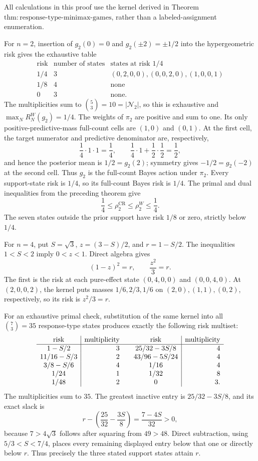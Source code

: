 All calculations in this proof use the kernel derived in Theorem \(\mathrm{thm{:}response\mbox{-}type\mbox{-}minimax\mbox{-}games}\), rather than a labeled-assignment enumeration.

For \(n=2\), insertion of \(g_2(0)=0\) and \(g_2(\pm2)=\pm1/2\) into the hypergeometric risk gives the exhaustive table
\[
\begin{array}{c|c|c}
\text{risk}&\text{number of states}&\text{states at risk }1/4\\ \hline
1/4&3&(0,2,0,0),(0,0,2,0),(1,0,0,1)\\
1/8&4&\text{none}\\
0&3&\text{none}.
\end{array}
\]
The multiplicities sum to \(\binom{5}{3}=10=|\mathcal N_2|\), so this is exhaustive and \(\max_NR_N^W(g_2)=1/4\).  The weights of \(\pi_2\) are positive and sum to one.  Its only positive-predictive-mass full-count cells are \((1,0)\) and \((0,1)\).  At the first cell, the target numerator and predictive denominator are, respectively,
\[
 \frac14\cdot1\cdot1=\frac14,
 \qquad
 \frac14\cdot1+\frac12\cdot\frac12=\frac12,
\]
and hence the posterior mean is \(1/2=g_2(2)\); symmetry gives \(-1/2=g_2(-2)\) at the second cell.  Thus \(g_2\) is the full-count Bayes action under \(\pi_2\).  Every support-state risk is \(1/4\), so its full-count Bayes risk is \(1/4\).  The primal and dual inequalities from the preceding theorem give
\[
 \frac14\leq\rho_2^{\mathrm{CR}}\leq\rho_2^W\leq\frac14.
\]
The seven states outside the prior support have risk \(1/8\) or zero, strictly below \(1/4\).

For \(n=4\), put \(S=\sqrt3\), \(z=(3-S)/2\), and \(r=1-S/2\).  The inequalities \(1<S<2\) imply \(0<z<1\).  Direct algebra gives
\[
 (1-z)^2=r,\qquad \frac{z^2}{3}=r.
\]
The first is the risk at each pure-effect state \((0,4,0,0)\) and \((0,0,4,0)\).  At \((2,0,0,2)\), the kernel puts masses \(1/6,2/3,1/6\) on \((2,0),(1,1),(0,2)\), respectively, so its risk is \(z^2/3=r\).

For an exhaustive primal check, substitution of the same kernel into all \(\binom73=35\) response-type states produces exactly the following risk multiset:
\[
\begin{array}{c|r@{\qquad}c|r}
\text{risk}&\text{multiplicity}&\text{risk}&\text{multiplicity}\\ \hline
1-S/2&3&25/32-3S/8&4\\
11/16-S/3&2&43/96-5S/24&4\\
3/8-S/6&4&1/16&4\\
1/24&1&1/32&8\\
1/48&2&0&3.
\end{array}
\]
The multiplicities sum to \(35\).  The greatest inactive entry is \(25/32-3S/8\), and its exact slack is
\[
 r-\left(\frac{25}{32}-\frac{3S}{8}\right)
 =\frac{7-4S}{32}>0,
\]
because \(7>4\sqrt3\) follows after squaring from \(49>48\).  Direct subtraction, using \(5/3<S<7/4\), places every remaining displayed entry below that one or directly below \(r\).  Thus precisely the three stated support states attain \(r\).

